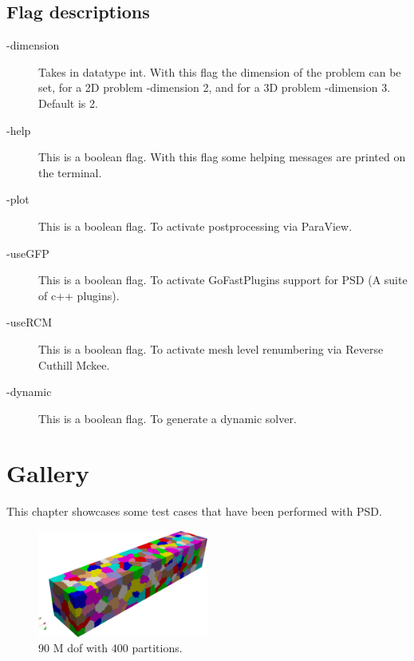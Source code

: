 \documentclass{report}
\begin{document}
\section{Flag descriptions}
\begin{description}

\item[-dimension] Takes in datatype {\ttfamily int}. With this flag the dimension of the problem can be set, for a 2D problem {\ttfamily -dimension 2}, and for a 3D problem {\ttfamily -dimension 3}. Default is 2.

\item[-help] This is a boolean flag. With this flag some  helping messages are printed on the terminal. 

\item[-plot] This is a boolean flag. To activate postprocessing via ParaView. 

\item[-useGFP] This is a boolean flag. To activate GoFastPlugins support for PSD (A suite of c++ plugins). 

\item[-useRCM] This is a boolean flag. To activate mesh level renumbering via Reverse Cuthill Mckee. 

\item[-dynamic] This is a boolean flag. To generate a dynamic solver. 



\end{description}

\chapter{Gallery}

This chapter showcases some test cases that have been performed with PSD.

\begin{figure}
    \centering
    \includegraphics[width=0.5\textwidth]{./Images/400partmesh3d.png}
    \caption{90 M dof with 400 partitions.}
    \label{fig:90Mdof}
\end{figure}
\end{document}
